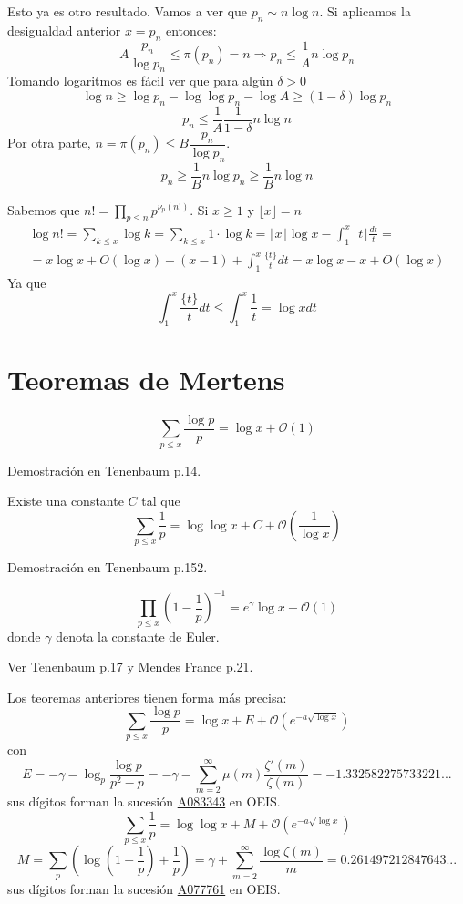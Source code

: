 \documentclass[TAN.tex]{subfiles}
\begin{document}
Esto ya es otro resultado. Vamos a ver que $p_n \sim n \log n$. Si aplicamos la desigualdad anterior $x=p_n$ entonces:
$$
A\frac{p_n}{\log p_n} \leq \pi(p_n) = n \Rightarrow p_n \leq \frac{1}{A}n\log p_n 
$$
Tomando logaritmos es fácil ver que para algún $\delta >0$
$$
\log n \geq \log p_n - \log \log p_n - \log A \geq (1-\delta) \log p_n$$ 
$$
p_n \leq \frac{1}{A}\frac{1}{1-\delta}n \log n$$
Por otra parte, $n = \pi(p_n) \leq B \dfrac{p_n}{\log p_n}$.
$$p_n \geq \frac{1}{B}n\log p_n \geq \frac{1}{B}n \log n$$

\begin{dem}
Sabemos que $n! = \prod_{p\leq n} p^{\nu_p(n!)}$. Si $x\geq 1$ y $\lfloor x \rfloor = n$
\begin{gather*}
\log n! = \sum_{k\leq x} \log k = \sum_{k \leq x} 1 \cdot \log k = \lfloor x \rfloor\log x - \int_1^x \lfloor t \rfloor \frac{dt}{t} = \\ =
x\log x + O(\log x) - (x-1) + \int_1^x\frac{\{t\}}{t}dt =  x\log x - x  + O(\log x)
\end{gather*}
Ya que 
$$
 \int_1^x\frac{\{t\}}{t}dt  \leq  \int_1^x\frac{1}{t} = \log xdt 
$$
\end{dem}

\section{Teoremas de Mertens}
\begin{teorema}
\[ \sum_{p≤x} \frac{\log p}{p} = \log x + \mathcal{O}(1) \]
\end{teorema}
Demostración en Tenenbaum p.14.

\begin{teorema}[Mertens]
Existe una constante $C$ tal que
\[ \sum_{p≤x} \frac{1}{p} = \log \log x + C + \mathcal{O}\left(\frac{1}{\log x}\right) \]
\end{teorema}
Demostración en Tenenbaum p.152.

\begin{teorema}
\[ \prod_{p≤x} \left(1-\frac{1}{p}\right)^{-1} = e^γ\log x + \mathcal{O}(1) \]
donde $γ$ denota la constante de Euler.
\end{teorema}
Ver Tenenbaum p.17 y Mendes France p.21.

Los teoremas anteriores tienen forma más precisa:
\[ \sum_{p≤x} \frac{\log p}{p} = \log x + E + \mathcal{O}(e^{-a\sqrt{\log x}}) \]
con
\[ E = -γ-\log_{p} \frac{\log p}{p^2-p} = -γ-\sum_{m=2}^{∞} μ(m) \frac{ζ'(m)}{ζ(m)} = -1.332582275733221... \]
sus dígitos forman la sucesión \href{https://oeis.org/A083343}{A083343} en OEIS.
\[ \sum_{p≤x} \frac{1}{p} = \log \log x + M + \mathcal{O}(e^{-a\sqrt{\log x}}) \]
\[ M = \sum_{p} \left(\log \left(1-\frac{1}{p}\right)+\frac{1}{p}\right) = γ + \sum_{m=2}^{∞} \frac{\log ζ(m)}{m} = 0.261497212847643... \]
sus dígitos forman la sucesión \href{https://oeis.org/A077761}{A077761} en OEIS. 
\end{document}
